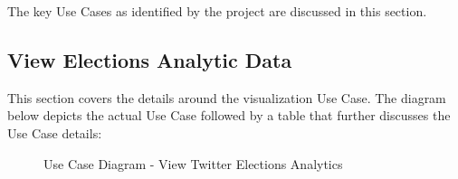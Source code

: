 \documentclass[12pt]{article} %
\begin{document}
  The key Use Cases as identified by the project are discussed in this section.
    	
    \subsection{View Elections Analytic Data}
    
    This section covers the details around the visualization Use Case. The diagram below depicts the actual Use Case followed by a table that further discusses the Use Case details:
    
    	\begin{figure}[H] %
    		\caption{Use Case Diagram - View Twitter Elections Analytics}
    		\label{fig:speciation}
    	\end{figure}
    	
\end{document}
